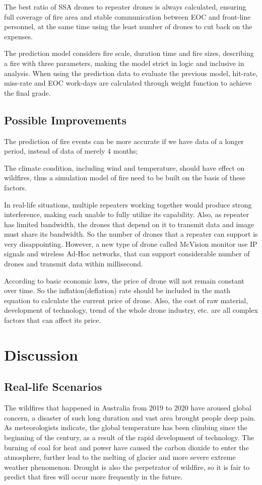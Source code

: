 \documentclass{mcmthesis}
\begin{document}
The best ratio of SSA drones to repeater drones is always calculated, ensuring full coverage of fire area and stable communication between EOC and front-line personnel, at the same time using the least number of drones to cut back on the expenses.

The prediction model considers fire scale, duration time and fire sizes, describing a fire with three parameters, making the model strict in logic and inclusive in analysis. When using the prediction data to evaluate the previous model, hit-rate, miss-rate and EOC work-days are calculated through weight function to achieve the final grade. 

\subsection{Possible Improvements}
The prediction of fire events can be more accurate if we have data of a longer period, instead of data of merely 4 months;

The climate condition, including wind and temperature, should have effect on wildfires, thus a simulation model of fire need to be built on the basis of these factors.  

In real-life situations, multiple repeaters working together would produce strong interference, making each unable to fully utilize its capability. Also, as repeater has limited bandwidth, the drones that depend on it to transmit data and image must share its bandwidth. So the number of drones that a repeater can support is very disappointing. However, a new type of drone called McVision monitor use IP signals and wireless Ad-Hoc networks, that can support considerable number of drones and transmit data within millisecond.

According to basic economic laws, the price of drone will not remain constant over time. So the inflation(deflation) rate should be included in the math equation to calculate the current price of drone. Also, the cost of raw material, development of technology, trend of the whole drone industry, etc. are all complex factors that can affect its price. 

\section{Discussion}
\subsection{Real-life Scenarios}
The wildfires that happened in Australia from 2019 to 2020 have aroused global concern, a disaster of such long duration and vast area brought people deep pain. As meteorologists indicate, the global temperature has been climbing since the beginning of the century, as a result of the rapid development of technology. The burning of coal for heat and power have caused the carbon dioxide to enter the atmosphere, further lead to the melting of glacier and more severe extreme weather phenomenon. Drought is also the perpetrator of wildfire, so it is fair to predict that fires will occur more frequently in the future.
\end{document}
